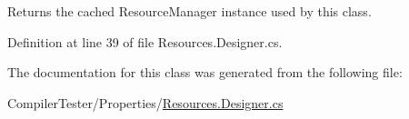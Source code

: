 Returns the cached Resource\+Manager instance used by this class. 



Definition at line 39 of file Resources.\+Designer.\+cs.



The documentation for this class was generated from the following file\+:\begin{DoxyCompactItemize}
\item 
Compiler\+Tester/\+Properties/\hyperlink{_compiler_tester_2_properties_2_resources_8_designer_8cs}{Resources.\+Designer.\+cs}\end{DoxyCompactItemize}

